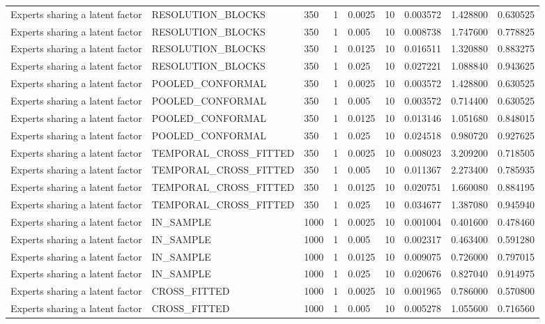 \begin{tabular}{lllllllll}
Experts sharing a latent factor & RESOLUTION\_BLOCKS & 350 & 1 & 0.0025 & 10 & 0.003572 & 1.428800 & 0.630525 \\
Experts sharing a latent factor & RESOLUTION\_BLOCKS & 350 & 1 & 0.005 & 10 & 0.008738 & 1.747600 & 0.778825 \\
Experts sharing a latent factor & RESOLUTION\_BLOCKS & 350 & 1 & 0.0125 & 10 & 0.016511 & 1.320880 & 0.883275 \\
Experts sharing a latent factor & RESOLUTION\_BLOCKS & 350 & 1 & 0.025 & 10 & 0.027221 & 1.088840 & 0.943625 \\
Experts sharing a latent factor & POOLED\_CONFORMAL & 350 & 1 & 0.0025 & 10 & 0.003572 & 1.428800 & 0.630525 \\
Experts sharing a latent factor & POOLED\_CONFORMAL & 350 & 1 & 0.005 & 10 & 0.003572 & 0.714400 & 0.630525 \\
Experts sharing a latent factor & POOLED\_CONFORMAL & 350 & 1 & 0.0125 & 10 & 0.013146 & 1.051680 & 0.848015 \\
Experts sharing a latent factor & POOLED\_CONFORMAL & 350 & 1 & 0.025 & 10 & 0.024518 & 0.980720 & 0.927625 \\
Experts sharing a latent factor & TEMPORAL\_CROSS\_FITTED & 350 & 1 & 0.0025 & 10 & 0.008023 & 3.209200 & 0.718505 \\
Experts sharing a latent factor & TEMPORAL\_CROSS\_FITTED & 350 & 1 & 0.005 & 10 & 0.011367 & 2.273400 & 0.785935 \\
Experts sharing a latent factor & TEMPORAL\_CROSS\_FITTED & 350 & 1 & 0.0125 & 10 & 0.020751 & 1.660080 & 0.884195 \\
Experts sharing a latent factor & TEMPORAL\_CROSS\_FITTED & 350 & 1 & 0.025 & 10 & 0.034677 & 1.387080 & 0.945940 \\
Experts sharing a latent factor & IN\_SAMPLE & 1000 & 1 & 0.0025 & 10 & 0.001004 & 0.401600 & 0.478460 \\
Experts sharing a latent factor & IN\_SAMPLE & 1000 & 1 & 0.005 & 10 & 0.002317 & 0.463400 & 0.591280 \\
Experts sharing a latent factor & IN\_SAMPLE & 1000 & 1 & 0.0125 & 10 & 0.009075 & 0.726000 & 0.797015 \\
Experts sharing a latent factor & IN\_SAMPLE & 1000 & 1 & 0.025 & 10 & 0.020676 & 0.827040 & 0.914975 \\
Experts sharing a latent factor & CROSS\_FITTED & 1000 & 1 & 0.0025 & 10 & 0.001965 & 0.786000 & 0.570800 \\
Experts sharing a latent factor & CROSS\_FITTED & 1000 & 1 & 0.005 & 10 & 0.005278 & 1.055600 & 0.716560 \\

\end{tabular}

